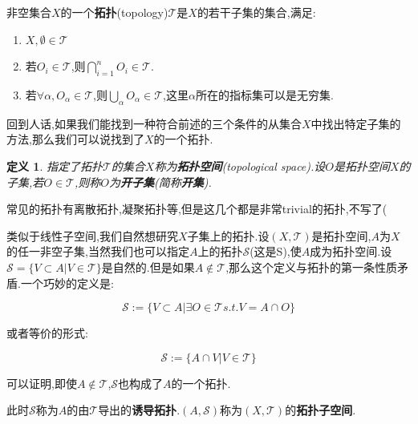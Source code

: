 \documentclass[UTF8]{article}
\begin{document}
	\begin{topology}
		
		非空集合$X$的一个\textbf{拓扑}(topology)$\mathscr{T}$是$X$的若干子集的集合,满足:
		
		\begin{enumerate}
			
			\item $X, \emptyset \in \mathscr{T}$
			
			\item 若$O_i \in \mathscr{T}$,则$\bigcap_{i=1}^n O_{i} \in \mathscr{T}$.
			
			\item 若$\forall \alpha, O_{\alpha} \in \mathscr{T}$,则$\bigcup_{\alpha} O_{\alpha} \in \mathscr{T}$,这里$\alpha$所在的指标集可以是无穷集.
		\end{enumerate}
		
	\end{topology}
	
	回到人话,如果我们能找到一种符合前述的三个条件的从集合$X$中找出特定子集的方法,那么我们可以说找到了$X$的一个拓扑.
	
	\newtheorem*{topologicalSpace}{定义}
	
	\begin{topologicalSpace}
		
		指定了拓扑$\mathscr{T}$的集合$X$称为\textbf{拓扑空间}(topological space).设$O$是拓扑空间$X$的子集,若$O \in \mathscr{T}$,则称$O$为\textbf{开子集}(简称\textbf{开集}).
		
	\end{topologicalSpace}
	
	常见的拓扑有离散拓扑,凝聚拓扑等,但是这几个都是非常trivial的拓扑,不写了(
	
	类似于线性子空间,我们自然想研究$X$子集上的拓扑.设$(X,\mathscr{T})$是拓扑空间,$A$为$X$的任一非空子集,当然我们也可以指定$A$上的拓扑$\mathscr{S}$(这是S),使$A$成为拓扑空间.设$\mathscr{S} = \{V \subset A | V \in \mathscr{T}\}$是自然的.但是如果$A \notin \mathscr{T}$,那么这个定义与拓扑的第一条性质矛盾.一个巧妙的定义是:
	
	\[\mathscr{S} := \{V \subset A | \exists O \in \mathscr{T} s.t. V = A \cap O\}\]
	
	或者等价的形式:
	
	\[\mathscr{S} := \{A \cap V | V \in \mathscr{T}\}\]
	
	可以证明,即使$A\notin\mathscr{T}$,$\mathscr{S}$也构成了$A$的一个拓扑.
	
	此时$\mathscr{S}$称为$A$的由$\mathscr{T}$导出的\textbf{诱导拓扑}.$(A,\mathscr{S})$称为$(X,\mathscr{T})$的\textbf{拓扑子空间}.
	
\end{document}
